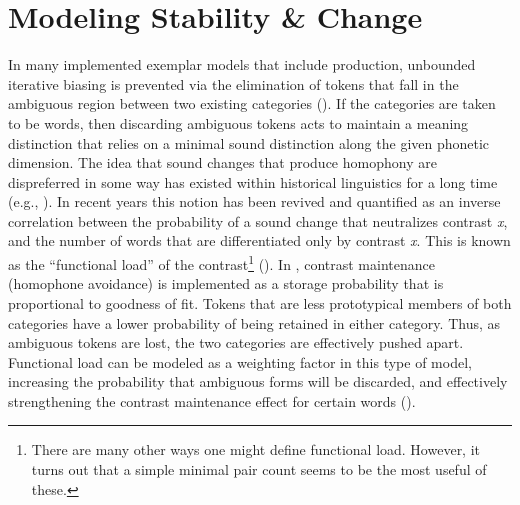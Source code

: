 \chapter{\label{sec:Models-of-Change}Modeling Stability \& Change}

In many implemented exemplar models that include production, unbounded
iterative biasing is prevented via the elimination of tokens that
fall in the ambiguous region between two existing categories (\citealp{Wedel2004,Wedel2006,Wedel2008,Blevins2009,DBLP:journals/corr/Tupper14a}).
If the categories are taken to be words, then discarding ambiguous
tokens acts to maintain a meaning distinction that relies on a minimal
sound distinction along the given phonetic dimension. The idea that
sound changes that produce homophony are dispreferred in some way
has existed within historical linguistics for a long time (e.g., \citealt{Martinet1955}).
In recent years this notion has been revived and quantified as an
inverse correlation between the probability of a sound change that
neutralizes contrast \emph{x}, and the number of words that are differentiated
only by contrast \emph{x}. This is known as the “functional load”
of the contrast\footnote{There are many other ways one might define functional load. However,
it turns out that a simple minimal pair count seems to be the most
useful of these.} (\citealp{Surendran2006,wedel2013high}). In \citet{Wedel2008},
contrast maintenance (homophone avoidance) is implemented as a storage
probability that is proportional to goodness of fit. Tokens that are
less prototypical members of both categories have a lower probability
of being retained in either category. Thus, as ambiguous tokens are
lost, the two categories are effectively pushed apart. Functional
load can be modeled as a weighting factor in this type of model, increasing
the probability that ambiguous forms will be discarded, and effectively
strengthening the contrast maintenance effect for certain words (\citealt{Soskuthy2015}).

